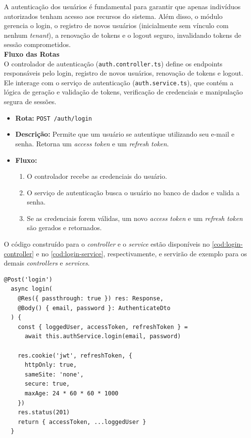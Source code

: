 A autenticação dos usuários é fundamental para garantir que apenas indivíduos autorizados tenham acesso aos recursos do sistema. Além disso, o módulo gerencia o login, o registro de novos usuários (inicialmente sem vínculo com nenhum \textit{tenant}), a renovação de tokens e o logout seguro, invalidando tokens de sessão comprometidos.
\\

\noindent\textbf{Fluxo das Rotas}\\
O controlador de autenticação (\texttt{auth.controller.ts}) define os endpoints responsáveis pelo login, registro de novos usuários, renovação de tokens e logout. Ele interage com o serviço de autenticação (\texttt{auth.service.ts}), que contém a lógica de geração e validação de tokens, verificação de credenciais e manipulação segura de sessões.

\begin{itemize}
	\item \textbf{Rota:} \texttt{POST /auth/login}
	\item \textbf{Descrição:} Permite que um usuário se autentique utilizando seu e-mail e senha. Retorna um \textit{access token} e um \textit{refresh token}.
	\item \textbf{Fluxo:}
	\begin{enumerate}
		\item O controlador recebe as credenciais do usuário.
		\item O serviço de autenticação busca o usuário no banco de dados e valida a senha.
		\item Se as credenciais forem válidas, um novo \textit{access token} e um \textit{refresh token} são gerados e retornados.
	\end{enumerate}
\end{itemize}

O código construído para o \textit{controller} e  o \textit{service} estão disponíveis no \autoref{cod:login-controller} e  no \autoref{cod:login-service}, respectivamente, e servirão de exemplo para os demais \textit{controllers} e \textit{services}.

\begin{lstlisting}[caption={Exemplo de \textit{controller} para \textit{login}.},label={cod:login-controller}]
	@Post('login')
  async login(
    @Res({ passthrough: true }) res: Response,
    @Body() { email, password }: AuthenticateDto
  ) {
    const { loggedUser, accessToken, refreshToken } =
      await this.authService.login(email, password)

    res.cookie('jwt', refreshToken, {
      httpOnly: true,
      sameSite: 'none',
      secure: true,
      maxAge: 24 * 60 * 60 * 1000
    })
    res.status(201)
    return { accessToken, ...loggedUser }
  }
\end{lstlisting}

